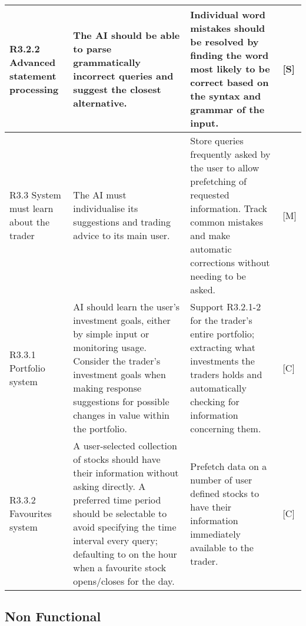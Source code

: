\documentclass{IEEEtran}
\begin{document}
\begin{center}
\begin{longtable}{ | m{3cm} | m{7cm} | m{7cm} | m{0.5cm} | }
		\hline
		
		R3.2.2 Advanced statement processing & 
		The AI should be able to parse grammatically incorrect queries and suggest the closest alternative. & 
		Individual word mistakes should be resolved by finding the word most likely to be correct based on the syntax and grammar of the input. & 
		[S] \\
		
		\hline
		
		R3.3 System must learn about the trader & 
		The AI must individualise its suggestions and trading advice to its main user. & 
		Store queries frequently asked by the user to allow prefetching of requested information. Track common mistakes and make automatic corrections without needing to be asked. & 
		[M] \\
		
		\hline
		
		R3.3.1 Portfolio system & 
		AI should learn the user’s investment goals, either by simple input or monitoring usage. Consider the trader’s investment goals when making response suggestions for possible changes in value within the portfolio. & 
		Support R3.2.1-2 for the trader’s entire portfolio; extracting what investments the traders holds and automatically checking for information concerning them. & 
		[C] \\
		
		\hline
		
		R3.3.2 Favourites system & 
		A user-selected collection of stocks should have their information without asking directly. A preferred time period should be selectable to avoid specifying the time interval every query; defaulting to on the hour when a favourite stock opens/closes for the day. & 
		Prefetch data on a number of user defined stocks to have their information immediately available to the trader. &
		[C] \\
		
		\hline
	
	\end{longtable}
	\end{center}
	
	\subsection{Non Functional}
	
\end{document}
